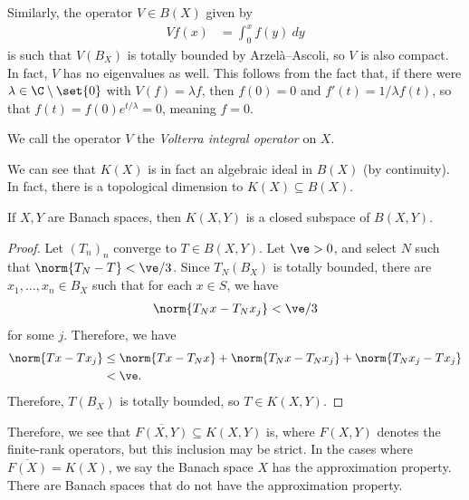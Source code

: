 \documentclass[10pt]{mypackage}
\begin{document}
Similarly, the operator $V\in B(X)$ given by
\begin{align*}
  Vf(x) &= \int_{0}^{x} f(y)\:dy
\end{align*}
is such that $V\left(B_X\right)$ is totally bounded by Arzelà--Ascoli, so $V$ is also compact. In fact, $V$ has no eigenvalues as well. This follows from the fact that, if there were $\lambda\in \C\setminus \set{0}$ with $V(f) = \lambda f$, then $f(0) = 0$ and $f'(t) = 1/\lambda f(t)$, so that $f(t) = f(0) e^{t/\lambda} = 0$, meaning $f = 0$.

We call the operator $V$ the \textit{Volterra integral operator} on $X$.

We can see that $K(X)$ is in fact an algebraic ideal in $B(X)$ (by continuity). In fact, there is a topological dimension to $K(X)\subseteq B(X)$.
\begin{proposition}
  If $X,Y$ are Banach spaces, then $K(X,Y)$ is a closed subspace of $B(X,Y)$.
\end{proposition}
\begin{proof}
  Let $\left( T_n \right)_n$ converge to $T\in B(X,Y)$. Let $\ve > 0$, and select $N$ such that $\norm{T_N - T} < \ve/3$. Since $T_N\left(B_X\right)$ is totally bounded, there are $x_1,\dots,x_n\in B_X$ such that for each $x\in S$, we have
  \begin{align*}
    \norm{T_Nx - T_Nx_j} < \ve/3
  \end{align*}
  for some $j$. Therefore, we have
  \begin{align*}
    \norm{Tx-Tx_j } &\leq \norm{Tx-T_Nx} + \norm{T_Nx-T_Nx_j} + \norm{T_Nx_j - Tx_j}\\
                    &< \ve.
  \end{align*}
  Therefore, $T\left( B_X \right)$ is totally bounded, so $T\in K(X,Y)$.
\end{proof}
Therefore, we see that $ \overline{F(X,Y)}\subseteq K(X,Y) $ is, where $F(X,Y)$ denotes the finite-rank operators, but this inclusion may be strict. In the cases where $ \overline{F(X)} = K(X) $, we say the Banach space $X$ has the approximation property. There are Banach spaces that do not have the approximation property.
\end{document}
